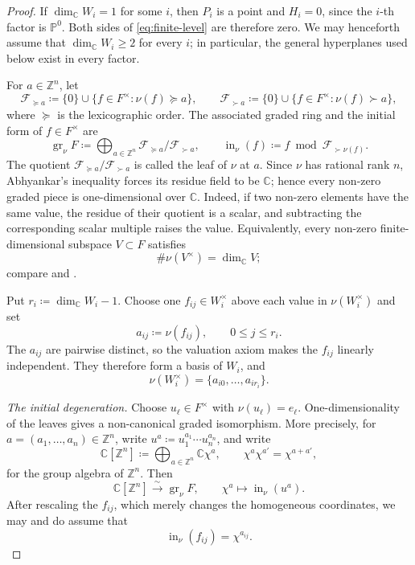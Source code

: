 \documentclass[11pt,a4paper]{amsart}
\newcommand{\inival}{\operatorname{in}_{\nu}}
\begin{document}
\begin{proof}
If $\dim_{\mathbb C}W_i=1$ for some $i$, then $P_i$ is a point and
$H_i=0$, since the $i$-th factor is $\mathbb P^0$.  Both sides of
\eqref{eq:finite-level} are therefore zero.  We may henceforth assume that
$\dim_{\mathbb C}W_i\geq2$ for every $i$; in particular, the general
hyperplanes used below exist in every factor.

For $a\in\mathbb Z^n$, let
\[
 \mathcal F_{\succeq a}\coloneqq \{0\}\cup\{f\in F^\times:\nu(f)\succeq a\},
 \qquad
 \mathcal F_{\succ a}\coloneqq \{0\}\cup\{f\in F^\times:\nu(f)\succ a\},
\]
where $\succeq$ is the lexicographic order.  The associated graded ring and
the initial form of $f\in F^\times$ are
\[
 \operatorname{gr}_\nu F
 \coloneqq \bigoplus_{a\in\mathbb Z^n}
    \mathcal F_{\succeq a}/\mathcal F_{\succ a},
 \qquad
 \inival(f)\coloneqq f\bmod\mathcal F_{\succ\nu(f)}.
\]
The quotient $\mathcal F_{\succeq a}/\mathcal F_{\succ a}$ is called the
leaf of $\nu$ at $a$.
Since $\nu$ has rational rank $n$, Abhyankar's inequality forces its residue
field to be $\mathbb C$; hence every non-zero graded piece is one-dimensional
over $\mathbb C$.  Indeed, if two non-zero elements have the same value,
the residue of their quotient is a scalar, and subtracting the corresponding
scalar multiple raises the value.  Equivalently, every non-zero finite-dimensional subspace
$V\subset F$ satisfies
\[
 \#\nu(V^\times)=\dim_{\mathbb C}V;
\]
compare \cite[Lemma~1.3]{LM09} and \cite[Section~10.3]{Xiabook}.

Put $r_i\coloneqq \dim_{\mathbb C}W_i-1$.  Choose one
$f_{ij}\in W_i^\times$ above each value in $\nu(W_i^\times)$ and set
\[
 a_{ij}\coloneqq \nu(f_{ij}),\qquad 0\leq j\leq r_i.
\]
The $a_{ij}$ are pairwise distinct, so the valuation axiom makes the
$f_{ij}$ linearly independent.  They therefore form a basis of $W_i$, and
\[
 \nu(W_i^\times)=\{a_{i0},\ldots,a_{ir_i}\}.
\]

\smallskip
\noindent\emph{The initial degeneration.}
Choose $u_\ell\in F^\times$ with $\nu(u_\ell)=e_\ell$.  One-dimensionality
of the leaves gives a non-canonical graded isomorphism.  More precisely, for
$a=(a_1,\ldots,a_n)\in\mathbb Z^n$, write
$u^a\coloneqq u_1^{a_1}\cdots u_n^{a_n}$, and write
\[
 \mathbb C[\mathbb Z^n]
 \coloneqq \bigoplus_{a\in\mathbb Z^n}\mathbb C\chi^a,
 \qquad \chi^a\chi^{a'}=\chi^{a+a'},
\]
for the group algebra of $\mathbb Z^n$.  Then
\[
 \mathbb C[\mathbb Z^n]\xrightarrow{\sim}\operatorname{gr}_\nu F,
 \qquad
 \chi^a\longmapsto\inival(u^a).
\]
After rescaling the $f_{ij}$, which merely changes the homogeneous
coordinates, we may and do assume that
\[
 \inival(f_{ij})=\chi^{a_{ij}}.
\]


\end{proof}
\end{document}
